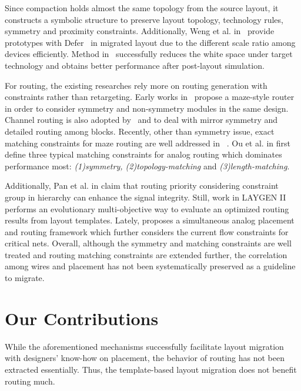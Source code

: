   Since compaction holds almost the same topology from the source layout, it constructs a symbolic structure to preserve layout topology, technology rules, symmetry and proximity constraints. Additionally, Weng et al. in~\cite{ALP_YPWeng_iccad2011} provide prototypes with Defer~\cite{defer_jackey_tcad10} in migrated layout due to the different scale ratio among devices efficiently. Method in~\cite{ALP_YPWeng_iccad2011} successfully reduces the white space under target technology and obtains better performance after post-layout simulation. 

  For routing, the existing researches rely more on routing generation with constraints rather than retargeting. Early works in~\cite{KOAN_ANAGRAMII-JSSC1991,aicon_malE_tcad96,ppraic_Linfu_iccad2010} propose a maze-style router in order to consider symmetry and non-symmetry modules in the same design. Channel routing is also adopted by~\cite{cbcrams_UChoudhury_tcad93} and \cite{aicon_malE_tcad96} to deal with mirror symmetry and detailed routing among blocks. Recently, other than symmetry issue, exact matching constraints for maze routing are well addressed in ~\cite{ermams_MMOzdal_tcad09}. Ou et al. in \cite{numarmc_HCOu_dac12} first define three typical matching constraints for analog routing which dominates performance most: {\it(1)symmetry, (2)topology-matching} and {\it (3)length-matching}. 

  Additionally, Pan et al. in \cite{Pan_CGR_ICCAD2012} claim that routing priority considering constraint group in hierarchy can enhance the signal integrity. Still, work in LAYGEN II \cite{LAYGENII_TCAD13} performs an evolutionary multi-objective way to evaluate an optimized routing results from layout templates. Lately, \cite{SAPR_DAC13} proposes a simultaneous analog placement and routing framework which further considers the current flow constraints for critical nets. Overall, although the symmetry and matching constraints are well treated and routing matching constraints are extended further, the correlation among wires and placement has not been systematically preserved as a guideline to migrate.

  \section{Our Contributions}\label{sec:contribution}

  While the aforementioned mechanisms successfully facilitate layout migration with designers' know-how on placement, the behavior of routing has not been extracted essentially. Thus, the template-based layout migration does not benefit routing much. 
 
